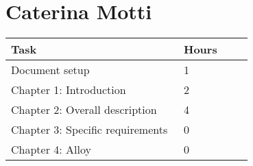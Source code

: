 \section{Caterina Motti}
\begin{center}
	\begin{tabular}{@{}p{0.5\linewidth} p{0.2\linewidth}@{}}
		\hline
		\textbf{Task} & \textbf{Hours} \\ \hline
            Document setup & 1 \\ \hline
            Chapter 1: Introduction & 2 \\ \hline
            Chapter 2: Overall description & 4 \\ \hline
            Chapter 3: Specific requirements & 0 \\ \hline
            Chapter 4: Alloy & 0 \\ \hline
	\end{tabular}
\end{center}
